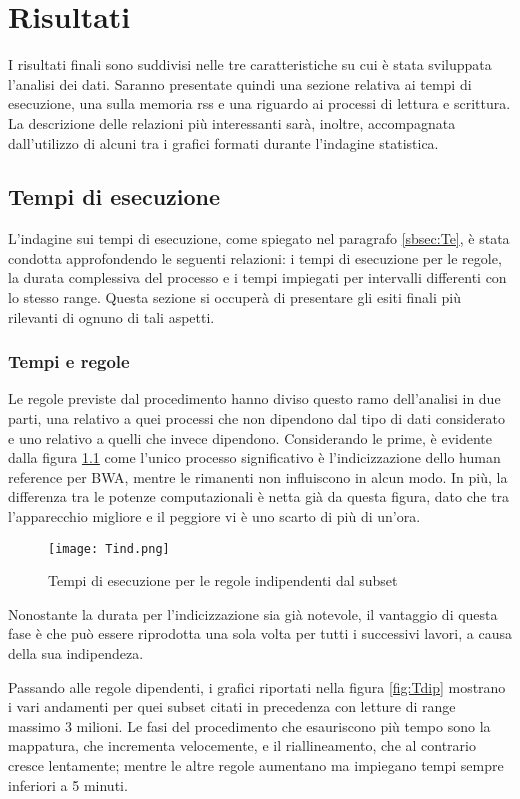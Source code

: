 \chapter{Risultati}
\label{cap:3}
I risultati finali sono suddivisi nelle tre caratteristiche su cui è stata sviluppata l'analisi dei dati.
Saranno presentate quindi una sezione relativa ai tempi di esecuzione, una sulla memoria rss e una riguardo ai processi di lettura e scrittura. 
La descrizione delle relazioni più interessanti sarà, inoltre, accompagnata dall'utilizzo di alcuni tra i grafici formati durante l'indagine statistica.

\section{Tempi di esecuzione}
L'indagine sui tempi di esecuzione, come spiegato nel paragrafo \ref{sbsec:Te}, è stata condotta approfondendo le seguenti relazioni: i tempi di esecuzione per le regole, la durata complessiva del processo e i tempi impiegati per intervalli differenti con lo stesso range. 
Questa sezione si occuperà di presentare gli esiti finali più rilevanti di ognuno di tali aspetti.

\subsection{Tempi e regole}
Le regole previste dal procedimento hanno diviso questo ramo dell'analisi in due parti, una relativo a quei processi che non dipendono dal tipo di dati considerato e uno relativo a quelli che invece dipendono. 
Considerando le prime, è evidente dalla figura \ref{fig:Tind} come l'unico processo significativo è l'indicizzazione dello human reference per BWA, mentre le rimanenti non influiscono in alcun modo. 
In più, la differenza tra le potenze computazionali è netta già da questa figura, dato che tra l'apparecchio migliore e il peggiore vi è uno scarto di più di un'ora.
\begin{figure}[H]
\centering
\texttt{[image: Tind.png]}
\caption{Tempi di esecuzione per le regole indipendenti dal subset}
\label{fig:Tind}
\end{figure}
Nonostante la durata per l'indicizzazione sia già notevole, il vantaggio di questa fase  è che può essere riprodotta una sola volta per tutti i successivi lavori, a causa della sua indipendeza.

Passando alle regole dipendenti, i grafici riportati nella figura \ref{fig:Tdip} mostrano i vari andamenti per quei subset citati in precedenza con letture di range massimo 3 milioni.
Le fasi del procedimento che esauriscono più tempo sono la mappatura, che incrementa velocemente, e il riallineamento, che al contrario cresce lentamente; mentre le altre regole aumentano ma impiegano tempi sempre inferiori a 5 minuti.

